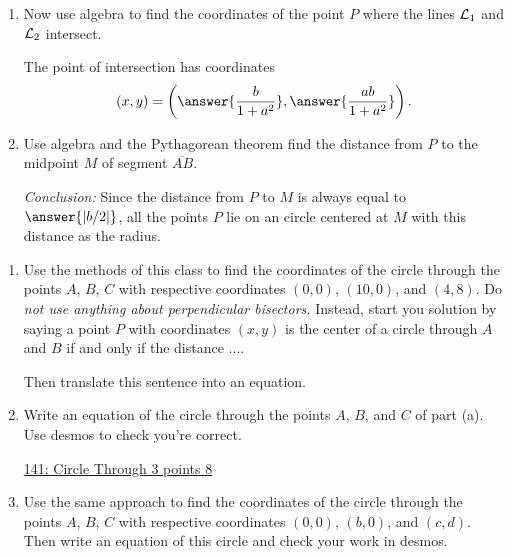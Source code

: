 \documentclass{ximera}
\begin{document}
\begin{question}
\begin{enumerate}
This line has equation
\[
   y = \answer{-\frac{1}{a}}\left( x - \answer{b} \right).
\]

\item Now use algebra to find the coordinates of the point $P$ where the lines ${\cal L}_1$ and ${\cal L}_2$ intersect.

The point of intersection has coordinates
\[
    (x,y) = \left(  \answer{\frac{b}{1+a^2}}  , \answer{\frac{ab}{1+a^2}}   \right) .
\]

\item Use algebra and the Pythagorean theorem find the distance from $P$ to the midpoint $M$ of segment $\overline{AB}$.

\emph{Conclusion:} Since the distance from $P$ to $M$ is always equal to $\answer{|b/2|}$, all the points $P$ lie on an circle centered at $M$ with this distance as the radius. 

\end{enumerate}
\end{question}


\begin{question} \label{Qer3er3}
\begin{enumerate}
\item Use the methods of this class to find the coordinates of the circle through the points $A$, $B$, $C$ with respective coordinates $(0,0)$, $(10,0)$, and $(4,8)$. Do \emph{not use anything about perpendicular bisectors.} Instead, start you solution by saying a point $P$ with coordinates $(x,y)$ is the center of a circle through $A$ and $B$ if and only if the distance ....

Then translate this sentence into an equation.

\item Write an equation of the circle through the points $A$, $B$, and $C$ of part (a). Use desmos to check you're correct.


\begin{onlineOnly}
    \begin{center}
\end{center}
\end{onlineOnly}

\href{https://www.desmos.com/calculator/4asngajdsq}{141: Circle Through 3 points 8}



\item Use the same approach to find the coordinates of the circle through the points $A$, $B$, $C$ with respective coordinates $(0,0)$, $(b,0)$, and $(c,d)$. Then write an equation of this circle and check your work in desmos.
\end{enumerate}
\end{question}
\end{document}
